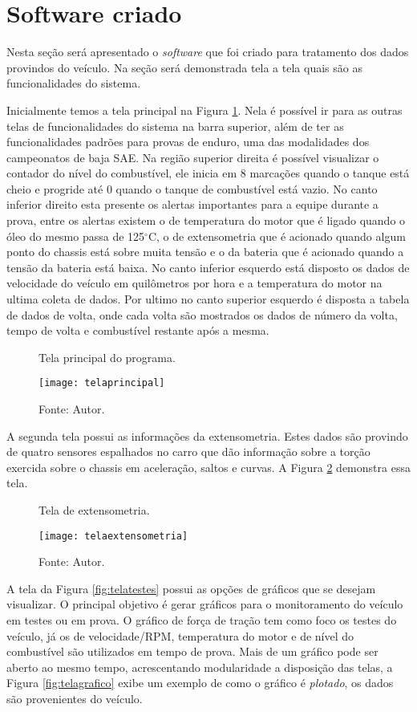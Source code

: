\section {Software criado}
Nesta seção será apresentado o \textit{software} que foi criado para tratamento dos dados provindos do veículo. Na seção será demonstrada tela a tela quais são as funcionalidades do sistema.

Inicialmente temos a tela principal na Figura \ref{fig:telaprincipal}. Nela é possível ir para as outras telas de funcionalidades do sistema na barra superior, além de ter as funcionalidades padrões para provas de enduro, uma das modalidades dos campeonatos de baja SAE. Na região superior direita é possível visualizar o contador do nível do combustível, ele inicia em 8 marcações quando o tanque está cheio e progride até 0 quando o tanque de combustível está vazio. No canto inferior direito esta presente os alertas importantes para a equipe durante a prova, entre os alertas existem o de temperatura do motor que é ligado quando o óleo do mesmo passa de 125$^\circ$C, o de extensometria que é acionado quando algum ponto do chassis está sobre muita tensão e o da bateria que é acionado quando a tensão da bateria está baixa. No canto inferior esquerdo está disposto os dados de velocidade do veículo em quilômetros por hora e a temperatura do motor na ultima coleta de dados. Por ultimo no canto superior esquerdo é disposta a tabela de dados de volta, onde cada volta são mostrados os dados de número da volta, tempo de volta e combustível restante após a mesma. 

\begin{figure}[!htb]
	\centering
		\caption{Tela principal do programa.}
		\texttt{[image: telaprincipal]} 
		\caption*{Fonte: Autor.}
		\label{fig:telaprincipal}
\end{figure}    

A segunda tela possui as informações da extensometria. Estes dados são provindo de quatro sensores espalhados no carro que dão informação sobre a torção exercida sobre o chassis em aceleração, saltos e curvas. A Figura \ref{fig:telaextensometria} demonstra essa tela.

\begin{figure}[!htb]
	\centering
		\caption{Tela de extensometria.}
		\texttt{[image: telaextensometria]} 
		\caption*{Fonte: Autor.}
		\label{fig:telaextensometria}
\end{figure}    

A tela da Figura \ref{fig:telatestes} possui as opções de gráficos que se desejam visualizar. O principal objetivo é gerar gráficos para o monitoramento do veículo em testes ou em prova. O gráfico de força de tração tem como foco os testes do veículo, já os de velocidade/RPM, temperatura do motor e de nível do combustível são utilizados em tempo de prova. Mais de um gráfico pode ser aberto ao mesmo tempo, acrescentando modularidade a disposição das telas, a Figura \ref{fig:telagrafico} exibe um exemplo de como o gráfico é \textit{plotado}, os dados são provenientes do veículo.

